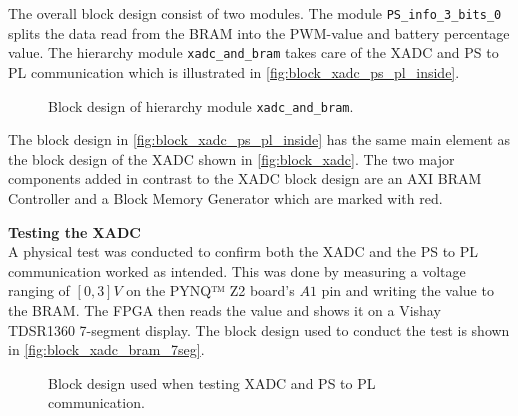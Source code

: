 \documentclass[../report.tex]{subfiles}
\begin{document}
The overall block design consist of two modules. The module \texttt{PS\_info\_3\_bits\_0} splits the data read from the BRAM into the PWM-value and battery percentage value. The hierarchy module \texttt{xadc\_and\_bram} takes care of the XADC and PS to PL communication which is illustrated in \autoref{fig:block_xadc_ps_pl_inside}. 

\begin{figure}[H]
    \centering    
    \noindent{}
    \caption{Block design of hierarchy module \texttt{xadc\_and\_bram}.}
    \label{fig:block_xadc_ps_pl_inside}
\end{figure}

The block design in \autoref{fig:block_xadc_ps_pl_inside} has the same main element as the block design of the XADC shown in \autoref{fig:block_xadc}. The two major components added in contrast to the XADC block design are an AXI BRAM Controller and a Block Memory Generator which are marked with red. 

\textbf{Testing the XADC}\\
A physical test was conducted to confirm both the XADC and the PS to PL communication worked as intended. This was done by measuring a voltage ranging of $[0, 3] V$ on the PYNQ™ Z2 board's $A1$ pin and writing the value to the BRAM. The FPGA then reads the value and shows it on a Vishay TDSR1360 7-segment display. The block design used to conduct the test is shown in \autoref{fig:block_xadc_bram_7seg}.

\begin{figure}[H]
    \centering    
    \noindent{}
    \caption{Block design used when testing XADC and PS to PL communication.}
    \label{fig:block_xadc_bram_7seg}
\end{figure}
\end{document}
